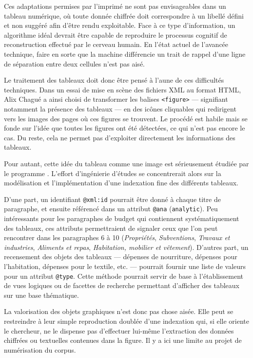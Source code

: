 Ces adaptations permises par l'imprimé ne sont pas envisageables dans un tableau numérique, où toute donnée chiffrée doit correspondre à un libellé défini et non suggéré afin d'être rendu exploitable. Face à ce type d'information, un algorithme idéal devrait être capable de reproduire le processus cognitif de reconstruction effectué par le cerveau humain. En l'état actuel de l'avancée technique, faire en sorte que la machine différencie un trait de rappel d'une ligne de séparation entre deux cellules n'est pas aisé.

Le traitement des tableaux doit donc être pensé à l'aune de ces difficultés techniques. Dans un essai de mise en scène des fichiers XML au format HTML, Alix Chagué a ainsi choisi de transformer les balises \texttt{<figure>} --- signifiant notamment la présence des tableaux --- en des icônes cliquables qui redirigent vers les images des pages où ces figures se trouvent. Le procédé est habile mais se fonde sur l'idée que toutes les figures ont été détectées, ce qui n'est pas encore le cas. Du reste, cela ne permet pas d'exploiter directement les informations des tableaux.

Pour autant, cette idée du tableau comme une image est sérieusement étudiée par le programme \timeus. L'effort d'ingénierie d'études se concentrerait alors sur la modélisation et l'implémentation d'une indexation fine des différents tableaux. 

D'une part, un identifiant \texttt{@xml:id} pourrait être donné à chaque titre de paragraphe, et ensuite référencé dans un attribut \texttt{@ana} (\texttt{analytic}). Peu intéressants pour les paragraphes de budget qui contiennent systématiquement des tableaux, ces attributs permettraient de signaler ceux que l'on peut rencontrer dans les paragraphes 6 à 10 (\textit{Propriétés}, \textit{Subventions}, \textit{Travaux et industries}, \textit{Aliments et repas}, \textit{Habitation, mobilier et vêtement}). D'autres part, un recensement des objets des tableaux --- dépenses de nourriture, dépenses pour l'habitation, dépenses pour le textile, etc. --- pourrait fournir une liste de valeurs pour un attribut \texttt{@type}. Cette méthode pourrait servir de base à l'établissement de vues logiques ou de facettes de recherche permettant d'afficher des tableaux sur une base thématique.

La valorisation des objets graphiques n'est donc pas chose aisée. Elle peut se restreindre à leur simple reproduction doublée d'une indexation qui, si elle oriente le chercheur, ne le dispense pas d'effectuer lui-même l'extraction des données chiffrées ou textuelles contenues dans la figure. Il y a ici une limite au projet de numérisation du corpus.

